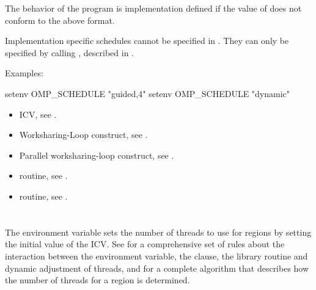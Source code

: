 The behavior of the program is implementation defined if the value of 
does not conform to the above format.

Implementation specific schedules cannot be specified in . They can
only be specified by calling , described in .

Examples:

\begin{ompEnv}
setenv OMP_SCHEDULE "guided,4"
setenv OMP_SCHEDULE "dynamic"
\end{ompEnv}

\crossreferences
\begin{itemize}
\item {} ICV, see .

\item Worksharing-Loop construct, see .

\item Parallel worksharing-loop construct, see .

\item {} routine, see .

\item {} routine, see .
\end{itemize}









\section{}
\label{sec:OMP_NUM_THREADS}
The  environment variable sets the number of threads to use for
 regions by setting the initial value of the  ICV. See
 for a comprehensive set of rules about the interaction between the
 environment variable, the  clause, the
 library routine and dynamic adjustment of threads, and
for a complete algorithm that describes how the number of
threads for a  region is determined.

